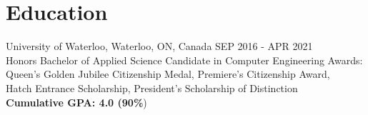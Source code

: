\documentclass[]{friggeri-cv}
\begin{document}
\section{Education}

\begin{entrylist}
	\entry
	{\vspace{0.1cm}University of Waterloo, Waterloo, ON, Canada \hfill{\normalfont\footnotesize SEP 2016 - APR 2021}}
	{\\{\vspace{0.1cm}\normalsize\normalfont Honors Bachelor of Applied Science Candidate in Computer Engineering}}
	{
		Awards: Queen's Golden Jubilee Citizenship Medal, Premiere's Citizenship Award, \\
		\vspace{0.2cm}\hspace{1.3cm} Hatch Entrance Scholarship, President's Scholarship of Distinction \\
		\textbf{Cumulative GPA: 4.0 (90\%})
	}
\end{entrylist}

% 
\end{document}
